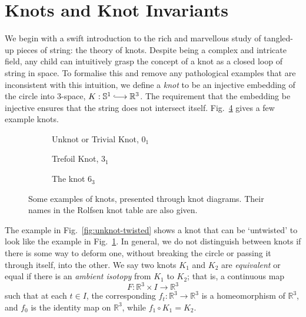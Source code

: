 \documentclass[12pt]{report}
\newcommand{\R}{\mathbb{R}}
\renewcommand{\S}{\mathbb{S}}
\newcommand{\inject}{\lhook\joinrel\longrightarrow}
\begin{document}
\section{Knots and Knot Invariants}

We begin with a swift introduction to the rich and marvellous study of tangled-up pieces of string: the theory of knots. Despite being a complex and intricate field, any child can intuitively grasp the concept of a knot as a closed loop of string in space. To formalise this and remove any pathological examples that are inconsistent with this intuition, we define a \textit{knot} to be an injective embedding of the circle into $3$-space, $K: \S^{1} \inject \R^{3}$. The requirement that the embedding be injective ensures that the string does not intersect itself. Fig.~\ref{fig:knot-examples} gives a few example knots.

\begin{figure}[hbt!]
	\centering
	\hspace*{\fill}
	\begin{subfigure}[b]{0.3 \textwidth}
		\centering
		\def\svgscale{0.2}
		
		\caption{Unknot or Trivial Knot, $0_{1}$}
		\label{fig:unknot}
	\end{subfigure}
	\hspace*{\fill}
	\begin{subfigure}[b]{0.3 \textwidth}
		\centering
		\def\svgscale{0.2}
		
		\caption{Trefoil Knot, $3_{1}$}
		\label{fig:trefoil}
	\end{subfigure}
	\hspace*{\fill}
	\begin{subfigure}[b]{0.3 \textwidth}
		\centering
		\def\svgscale{0.2}
		
		\caption{The knot $6_{3}$}
		\label{fig:6-3-knot}
	\end{subfigure}
	\caption{Some examples of knots, presented through knot diagrams. Their names in the Rolfsen knot table are also given.}
	\label{fig:knot-examples}
	\hspace*{\fill} 
\end{figure}

The example in Fig.~\ref{fig:unknot-twisted} shows a knot that can be `untwisted' to look like the example in Fig.~\ref{fig:unknot}. In general, we do not distinguish between knots if there is some way to deform one, without breaking the circle or passing it through itself, into the other. We say two knots $K_{1}$ and $K_{2}$ are \textit{equivalent} or equal if there is an \textit{ambient isotopy} from $K_{1}$ to $K_{2}$; that is, a continuous map
\[F: \R^{3} \times I \longrightarrow \R^{3}\]
such that at each $t \in I$, the corresponding $f_{t}: \R^{3} \longrightarrow \R^{3}$ is a homeomorphism of $\R^{3}$, and $f_{0}$ is the identity map on $\R^{3}$, while $f_{1} \circ K_{1} = K_{2}$.
\end{document}
